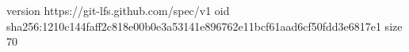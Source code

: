version https://git-lfs.github.com/spec/v1
oid sha256:1210c144faff2c818e00b0e3a53141e896762e11bcf61aad6cf50fdd3e6817e1
size 70
